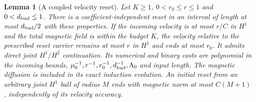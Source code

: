 \documentclass[11pt,a4paper]{amsart}
\newtheorem{lemma}[theorem]{Lemma}
\theoremstyle{definition}
\theoremstyle{remark}
\numberwithin{equation}{section}
\begin{document}
\begin{lemma}[A coupled velocity reset]\label{lem:coupledreset}
Let $K\ge1$, $0<r_0\le r\le1$ and $0<d_{\rm bud}\le1$. There is a coefficient-independent reset in an interval of length at most $d_{\rm bud}/2$ with these properties. If the incoming velocity is at most $r/C$ in $H^1$ and the total magnetic field is within the budget $K$, the velocity relative to the prescribed reset carrier remains at most $r$ in $H^1$ and ends at most $r_0$. It admits direct joint $H^1/H^2$ continuation. Its numerical and binary costs are polynomial in the incoming bounds, $\mu_0^{-1},r^{-1},r_0^{-1},d_{\rm bud}^{-1},\Lambda_0$ and input length. The magnetic diffusion is included in its exact induction evolution. An initial reset from an arbitrary joint $H^1$ ball of radius $M$ ends with magnetic norm at most $C(M+1)$, independently of its velocity accuracy.
\end{lemma}
\end{document}

